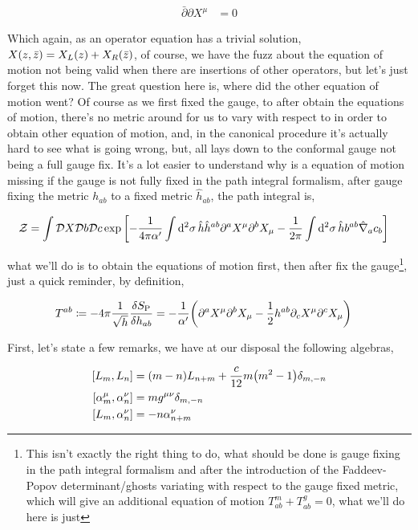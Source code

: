 \begin{align*}
    \bar\partial\partial X^\mu&=0
\end{align*}

Which again, as an operator equation has a trivial solution, $X\qty(z,\bar z)=X_L\qty(z)+X_R\qty(\bar z)$, of course, we have 
the fuzz about the equation of motion not being valid when there are insertions of other operators, but let's just forget this 
now. The great question here is, where did the other equation of motion went? Of course as we first fixed the gauge, to after 
obtain the equations of motion, there's no metric around for us to vary with respect to in order to obtain other equation of motion, and, in 
the canonical procedure it's actually hard to see what is going wrong, but, all lays down to the conformal gauge not being a full gauge fix. It's a 
lot easier to understand why is a equation of motion missing if the gauge is not fully fixed in the path integral formalism, after gauge fixing the 
metric $h_{ab}$ to a fixed metric ${\hat h}_{ab}$, the path integral is,

\begin{align*}
    \mathcal Z&=\int\mathcal D{X}\mathcal D{b}\mathcal D{c}\exp\qty[-\frac{1}{4\pi\alpha'}\int\dd[2]{\sigma}\hat h{\hat h}^{ab}\partial^aX^\mu \partial^bX_\mu-\frac{1}{2\pi}\int\dd[2]{\sigma}\hat hb^{ab}{\hat \nabla}_ac_b]
\end{align*}

what we'll do is to obtain the equations of motion first, then after fix the gauge\footnote{This isn't exactly the right thing to do, what should be done is 
gauge fixing in the path integral formalism and after the introduction of the Faddeev-Popov determinant/ghosts variating with respect to the gauge 
fixed metric, which will give an additional equation of motion $T^m_{ab}+T^g_{ab}=0$, what we'll do here is just }, just a quick reminder, by definition,

\begin{align*}
    T^{ab}&\coloneq-4\pi\frac{1}{\sqrt{h}}\fdv{S_{\textnormal{P}}}{h_{ab}}=-\frac{1}{\alpha'}\qty(\partial^aX^\mu\partial^b X_\mu-\frac12h^{ab}\partial_cX^\mu\partial ^cX_\mu)
\end{align*}

First, let's state a few remarks, we have at our disposal the following algebras,

\begin{align*}
    \comm{L_m}{L_n}&=\qty(m-n)L_{n+m}+\frac{c}{12}m\qty(m^2-1)\delta_{m,-n}\\
    \comm{\alpha^\mu_m}{\alpha^\nu_n}&=mg^{\mu\nu}\delta_{m,-n}\\
    \comm{L_m}{\alpha^\nu_n}&=-n\alpha^\nu_{n+m}
\end{align*}

